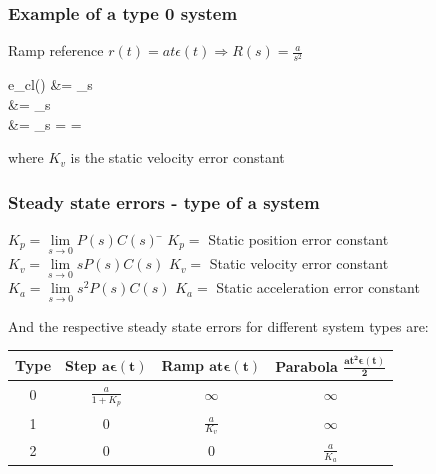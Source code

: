 \begin{frame}
	\frametitle{Example of a type 0 system}
		\begin{example}
			{Ramp reference $r(t) = at \epsilon (t) \Rightarrow R(s) = \frac{a}{s^2}$}
			\begin{flalign*}
				e_{cl}(\infty) &= \lim\limits_{s }   \\
				&= \lim\limits_{s }   \\
				&= \lim\limits_{s }  =  = \infty
			\end{flalign*}
			where $K_v$ is the static velocity error constant
		\end{example}
\end{frame}	

\begin{frame}
	\frametitle{Steady state errors - type of a system}
	\begin{block}{}
			\begin{tabbing}
			$K_p = \lim\limits_{s \rightarrow 0} P(s)C(s)$ 
			\hspace{2em} \= $K_p = $ Static position error constant \\
			$K_v = \lim\limits_{s \rightarrow 0}s P(s)C(s)$ \> $K_v = $ Static velocity error constant \\
			$K_a = \lim\limits_{s \rightarrow 0}s^2 P(s)C(s)$ \> $K_a = $ Static acceleration error constant
			\end{tabbing}
		\end{block}
	\begin{alertblock}{}
		And the respective steady state errors for different system types are: \\
		\vspace{1em}
		\centering
		\begin{tabular}{|c|c|c|c|}
			\hline \textbf{Type} & \textbf{Step} $\mathbf{a \boldsymbol{\epsilon} (t)}$ & \textbf{Ramp} $\mathbf{at \boldsymbol{\epsilon} (t)}$ & \textbf{Parabola} $\mathbf{\frac{at^2 \boldsymbol{\epsilon} (t)}{2}}$ \\ 
			\hline 0 & $\frac{a}{1 + K_p}$ & $\infty$ & $\infty$ \\ 
			\hline 1 & 0 & $\frac{a}{K_v}$ & $\infty$ \\ 
			\hline 2 & 0 & 0 & $\frac{a}{K_a}$ \\ 
			\hline 
		\end{tabular} 
	\end{alertblock}
\end{frame}


